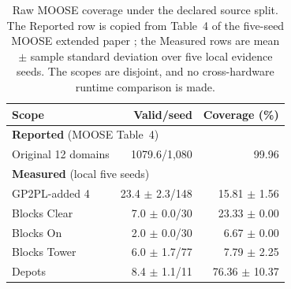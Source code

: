 \begin{table}[htbp]
\centering
\small
\setlength{\tabcolsep}{1.5pt}
\begin{tabular}{lrr}
\toprule
Scope & Valid/seed & Coverage (\%) \\
\midrule
\multicolumn{3}{l}{\textbf{Reported} (MOOSE Table~4)} \\
Original 12 domains & 1079.6/1,080 & 99.96 \\
\midrule
\multicolumn{3}{l}{\textbf{Measured} (local five seeds)} \\
GP2PL-added 4 & 23.4 $\pm$ 2.3/148 & 15.81 $\pm$ 1.56 \\
\quad Blocks Clear & 7.0 $\pm$ 0.0/30 & 23.33 $\pm$ 0.00 \\
\quad Blocks On & 2.0 $\pm$ 0.0/30 & 6.67 $\pm$ 0.00 \\
\quad Blocks Tower & 6.0 $\pm$ 1.7/77 & 7.79 $\pm$ 2.25 \\
\quad Depots & 8.4 $\pm$ 1.1/11 & 76.36 $\pm$ 10.37 \\
\bottomrule
\end{tabular}
\caption{Raw MOOSE coverage under the declared source split. The Reported row
is copied from Table~4 of the five-seed MOOSE extended paper
\cite{Chen2025MooseExtended}; the Measured rows are mean $\pm$ sample standard
deviation over five local evidence seeds. The scopes are disjoint, and no
cross-hardware runtime comparison is made.}
\label{tab:moose-reference}
\end{table}

